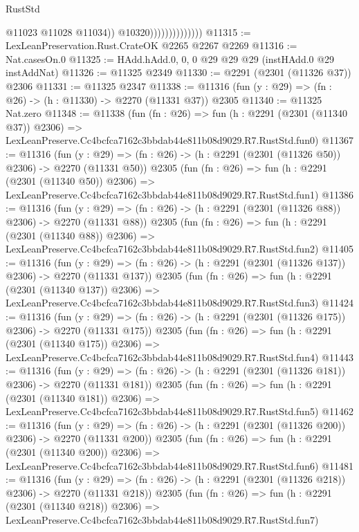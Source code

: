 \begin{lexlean}{RustStd}
\begin{coremodule}
                                    @11023
                                    @11028
                                    @11034))
                                @10320))))))))))))))
@11315 := LexLeanPreservation.Rust.CrateOK @2265 @2267 @2269
@11316 := Nat.casesOn.{0}
@11325 := HAdd.hAdd.{0, 0, 0} @29 @29 @29 (instHAdd.{0} @29 instAddNat)
@11326 := @11325 @2349
@11330 := @2291 (@2301 (@11326 @37)) @2306
@11331 := @11325 @2347
@11338 := @11316 (fun (y : @29) => (fn : @26) -> (h : @11330) -> @2270 (@11331 @37)) @2305
@11340 := @11325 Nat.zero
@11348 := @11338
    (fun (fn : @26) =>
    fun (h : @2291 (@2301 (@11340 @37)) @2306) =>
    LexLeanPreserve.Cc4bcfca7162c3bbdab44e811b08d9029.R7.RustStd.fun0)
@11367 := @11316
    (fun (y : @29) => (fn : @26) -> (h : @2291 (@2301 (@11326 @50)) @2306) -> @2270 (@11331 @50))
    @2305
    (fun (fn : @26) =>
    fun (h : @2291 (@2301 (@11340 @50)) @2306) =>
    LexLeanPreserve.Cc4bcfca7162c3bbdab44e811b08d9029.R7.RustStd.fun1)
@11386 := @11316
    (fun (y : @29) => (fn : @26) -> (h : @2291 (@2301 (@11326 @88)) @2306) -> @2270 (@11331 @88))
    @2305
    (fun (fn : @26) =>
    fun (h : @2291 (@2301 (@11340 @88)) @2306) =>
    LexLeanPreserve.Cc4bcfca7162c3bbdab44e811b08d9029.R7.RustStd.fun2)
@11405 := @11316
    (fun (y : @29) => (fn : @26) -> (h : @2291 (@2301 (@11326 @137)) @2306) -> @2270 (@11331 @137))
    @2305
    (fun (fn : @26) =>
    fun (h : @2291 (@2301 (@11340 @137)) @2306) =>
    LexLeanPreserve.Cc4bcfca7162c3bbdab44e811b08d9029.R7.RustStd.fun3)
@11424 := @11316
    (fun (y : @29) => (fn : @26) -> (h : @2291 (@2301 (@11326 @175)) @2306) -> @2270 (@11331 @175))
    @2305
    (fun (fn : @26) =>
    fun (h : @2291 (@2301 (@11340 @175)) @2306) =>
    LexLeanPreserve.Cc4bcfca7162c3bbdab44e811b08d9029.R7.RustStd.fun4)
@11443 := @11316
    (fun (y : @29) => (fn : @26) -> (h : @2291 (@2301 (@11326 @181)) @2306) -> @2270 (@11331 @181))
    @2305
    (fun (fn : @26) =>
    fun (h : @2291 (@2301 (@11340 @181)) @2306) =>
    LexLeanPreserve.Cc4bcfca7162c3bbdab44e811b08d9029.R7.RustStd.fun5)
@11462 := @11316
    (fun (y : @29) => (fn : @26) -> (h : @2291 (@2301 (@11326 @200)) @2306) -> @2270 (@11331 @200))
    @2305
    (fun (fn : @26) =>
    fun (h : @2291 (@2301 (@11340 @200)) @2306) =>
    LexLeanPreserve.Cc4bcfca7162c3bbdab44e811b08d9029.R7.RustStd.fun6)
@11481 := @11316
    (fun (y : @29) => (fn : @26) -> (h : @2291 (@2301 (@11326 @218)) @2306) -> @2270 (@11331 @218))
    @2305
    (fun (fn : @26) =>
    fun (h : @2291 (@2301 (@11340 @218)) @2306) =>
    LexLeanPreserve.Cc4bcfca7162c3bbdab44e811b08d9029.R7.RustStd.fun7)

\end{coremodule}
\end{lexlean}
